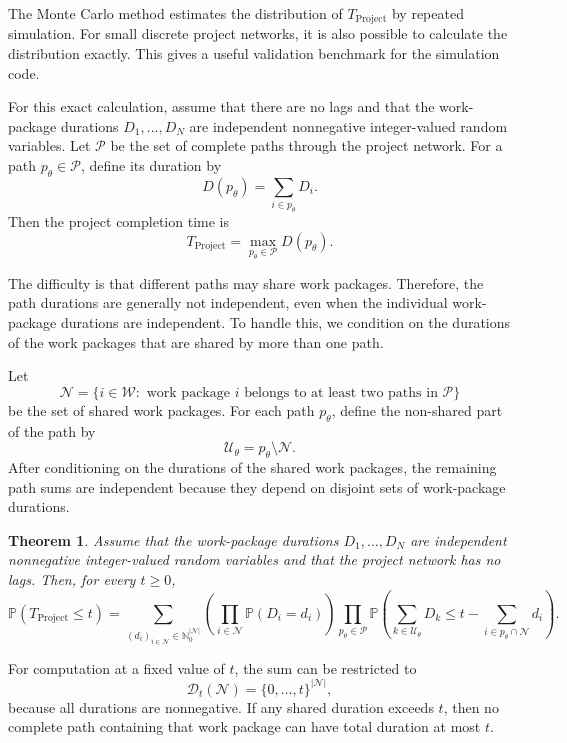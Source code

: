 \documentclass[11pt,a4paper]{article}
\newcommand{\cW}{\mathcal{W}}
\newcommand{\pP}{\mathbb{P}}
\newcommand{\1}{\mathbf{1}}
\theoremstyle{definition}
\theoremstyle{plain}
\newtheorem{theorem}{Theorem}[section]
\theoremstyle{remark}
\numberwithin{equation}{section}
\begin{document}
The Monte Carlo method estimates the distribution of $T_{\text{Project}}$ by repeated simulation. For small discrete project networks, it is also possible to calculate the distribution exactly. This gives a useful validation benchmark for the simulation code.

For this exact calculation, assume that there are no lags and that the work-package durations $D_1,\ldots,D_N$ are independent nonnegative integer-valued random variables. Let $\mathcal{P}$ be the set of complete paths through the project network. For a path $p_\theta\in\mathcal{P}$, define its duration by
\[
D(p_\theta)=\sum_{i\in p_\theta}D_i.
\]
Then the project completion time is
\[
T_{\text{Project}}
=
\max_{p_\theta\in\mathcal{P}}D(p_\theta).
\]

The difficulty is that different paths may share work packages. Therefore, the path durations are generally not independent, even when the individual work-package durations are independent. To handle this, we condition on the durations of the work packages that are shared by more than one path.

Let
\[
\mathcal{N}
=
\{i\in\cW:\text{ work package } i \text{ belongs to at least two paths in } \mathcal{P}\}
\]
be the set of shared work packages. For each path $p_\theta$, define the non-shared part of the path by
\[
\mathcal{U}_\theta=p_\theta\setminus\mathcal{N}.
\]
After conditioning on the durations of the shared work packages, the remaining path sums are independent because they depend on disjoint sets of work-package durations.

\begin{theorem}
Assume that the work-package durations $D_1,\ldots,D_N$ are independent nonnegative integer-valued random variables and that the project network has no lags. Then, for every $t\geq 0$,
\[
\pP(T_{\text{Project}}\leq t)
=
\sum_{(d_i)_{i\in\mathcal{N}}\in\mathbb{N}_0^{|\mathcal{N}|}}
\left(
\prod_{i\in\mathcal{N}}\pP(D_i=d_i)
\right)
\prod_{p_\theta\in\mathcal{P}}
\pP\left(
\sum_{k\in\mathcal{U}_\theta}D_k
\leq
t-\sum_{i\in p_\theta\cap\mathcal{N}}d_i
\right).
\]
\end{theorem}

For computation at a fixed value of $t$, the sum can be restricted to
\[
\mathcal{D}_t(\mathcal{N})
=
\{0,\ldots,t\}^{|\mathcal{N}|},
\]
because all durations are nonnegative. If any shared duration exceeds $t$, then no complete path containing that work package can have total duration at most $t$.
\end{document}
